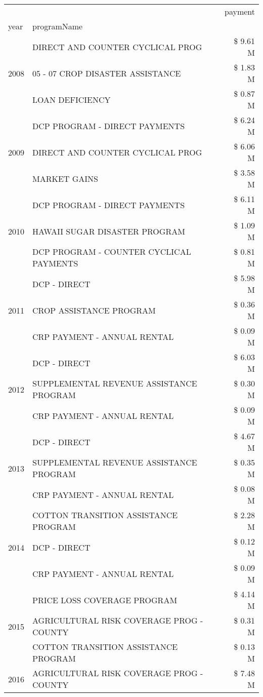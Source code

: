 \begin{tabular}{llr}
\toprule
 &  & payment \\
year & programName &  \\
\midrule
\multirow[t]{3}{*}{2008} & DIRECT AND COUNTER CYCLICAL PROG & \$ 9.61 M \\
 & 05 - 07 CROP DISASTER ASSISTANCE & \$ 1.83 M \\
 & LOAN DEFICIENCY & \$ 0.87 M \\
\cline{1-3}
\multirow[t]{3}{*}{2009} & DCP PROGRAM - DIRECT PAYMENTS & \$ 6.24 M \\
 & DIRECT AND COUNTER CYCLICAL PROG & \$ 6.06 M \\
 & MARKET GAINS & \$ 3.58 M \\
\cline{1-3}
\multirow[t]{3}{*}{2010} & DCP PROGRAM - DIRECT PAYMENTS & \$ 6.11 M \\
 & HAWAII SUGAR DISASTER PROGRAM & \$ 1.09 M \\
 & DCP PROGRAM - COUNTER CYCLICAL PAYMENTS & \$ 0.81 M \\
\cline{1-3}
\multirow[t]{3}{*}{2011} & DCP - DIRECT & \$ 5.98 M \\
 & CROP ASSISTANCE PROGRAM & \$ 0.36 M \\
 & CRP PAYMENT - ANNUAL RENTAL & \$ 0.09 M \\
\cline{1-3}
\multirow[t]{3}{*}{2012} & DCP - DIRECT & \$ 6.03 M \\
 & SUPPLEMENTAL REVENUE ASSISTANCE PROGRAM & \$ 0.30 M \\
 & CRP PAYMENT - ANNUAL RENTAL & \$ 0.09 M \\
\cline{1-3}
\multirow[t]{3}{*}{2013} & DCP - DIRECT & \$ 4.67 M \\
 & SUPPLEMENTAL REVENUE ASSISTANCE PROGRAM & \$ 0.35 M \\
 & CRP PAYMENT - ANNUAL RENTAL & \$ 0.08 M \\
\cline{1-3}
\multirow[t]{3}{*}{2014} & COTTON TRANSITION ASSISTANCE PROGRAM & \$ 2.28 M \\
 & DCP - DIRECT & \$ 0.12 M \\
 & CRP PAYMENT - ANNUAL RENTAL & \$ 0.09 M \\
\cline{1-3}
\multirow[t]{3}{*}{2015} & PRICE LOSS COVERAGE PROGRAM & \$ 4.14 M \\
 & AGRICULTURAL RISK COVERAGE PROG - COUNTY & \$ 0.31 M \\
 & COTTON TRANSITION ASSISTANCE PROGRAM & \$ 0.13 M \\
\cline{1-3}
\multirow[t]{3}{*}{2016} & AGRICULTURAL RISK COVERAGE PROG - COUNTY & \$ 7.48 M \\

\end{tabular}
